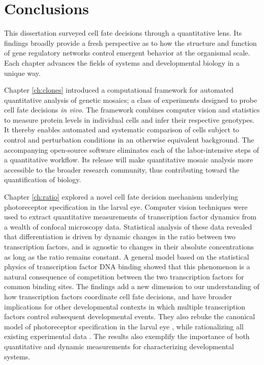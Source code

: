 \chapter{Conclusions}
\label{ch:conclusion}

This dissertation surveyed cell fate decisions through a quantitative lens. Its findings broadly provide a fresh perspective as to how the structure and function of gene regulatory networks control emergent behavior at the organismal scale. Each chapter advances the fields of systems and developmental biology in a unique way.

Chapter \ref{ch:clones} introduced a computational framework for automated quantitative analysis of genetic mosaics; a class of experiments designed to probe cell fate decisions \textit{in vivo}. The framework combines computer vision and statistics to measure protein levels in individual cells and infer their respective genotypes. It thereby enables automated and systematic comparison of cells subject to control and perturbation conditions in an otherwise equivalent background. The accompanying open-source software eliminates each of the labor-intensive steps of a quantitative workflow. Its release will make quantitative mosaic analysis more accessible to the broader research community, thus contributing toward the quantification of biology.

Chapter \ref{ch:ratio} explored a novel cell fate decision mechanism underlying photoreceptor specification in the larval eye. Computer vision techniques were used to extract quantitative measurements of transcription factor dynamics from a wealth of confocal microscopy data. Statistical analysis of these data revealed that differentiation is driven by dynamic changes in the ratio between two transcription factors, and is agnostic to changes in their absolute concentrations as long as the ratio remains constant. A general model based on the statistical physics of transcription factor DNA binding showed that this phenomenon is a natural consequence of competition between the two transcription factors for common binding sites. The findings add a new dimension to our understanding of how transcription factors coordinate cell fate decisions, and have broader implications for other developmental contexts in which multiple transcription factors control subsequent developmental events. They also rebuke the canonical model of photoreceptor specification in the larval eye \cite{Graham2010}, while rationalizing all existing experimental data \cite{Shwartz2013,BoisclairLachance2014,Pelaez2015a}. The results also exemplify the importance of both quantitative and dynamic measurements for characterizing developmental systems. 

